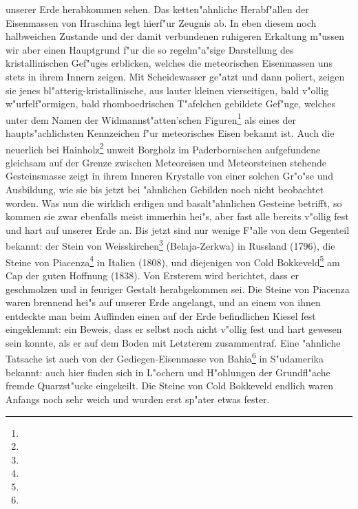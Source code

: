 \documentclass[a4paper, 8pt, oneside, polutonikogreek, german]{article}
\begin{document}
unserer Erde herabkommen sehen. Das ketten"ahnliche Herabf"allen der Eisenmassen von Hraschina legt hierf"ur Zeugnis ab. In eben diesem noch halbweichen Zustande und der damit verbundenen ruhigeren Erkaltung m"ussen wir aber einen Hauptgrund f"ur die so regelm"a"sige Darstellung des kristallinischen Gef"uges erblicken, welches die meteorischen Eisenmassen uns stets in ihrem Innern zeigen. Mit Scheidewasser ge"atzt und dann poliert, zeigen sie jenes bl"atterig-kristallinische, aus lauter kleinen vierseitigen, bald v"ollig w"urfelf"ormigen, bald rhomboedrischen T"afelchen gebildete Gef"uge, welches unter dem Namen der Widmannst"atten'schen Figuren\footnote{} als eines der haupts"achlichsten Kennzeichen f"ur meteorisches Eisen bekannt ist. Auch die neuerlich bei Hainholz\footnote{} unweit Borgholz im Paderbornischen aufgefundene gleichsam auf der Grenze zwischen Meteoreisen und Meteorsteinen stehende Gesteinsmasse zeigt in ihrem Inneren Krystalle von einer solchen Gr"o"se und Ausbildung, wie sie bis jetzt bei "ahnlichen Gebilden noch nicht beobachtet worden. Was nun die wirklich erdigen und basalt"ahnlichen Gesteine betrifft, so kommen sie zwar ebenfalls meist immerhin hei"s, aber fast alle bereits v"ollig fest und hart auf unserer Erde an. Bis jetzt sind nur wenige F"alle von dem Gegenteil bekannt: der Stein von Weisskirchen\footnote{} (Belaja-Zerkwa) in Russland (1796), die Steine von Piacenza\footnote{} in Italien (1808), und diejenigen von Cold Bokkeveld\footnote{} am Cap der guten Hoffnung (1838). Von Ersterem wird berichtet, dass er geschmolzen und in feuriger Gestalt herabgekommen sei. Die Steine von Piacenza waren brennend hei"s auf unserer Erde angelangt, und an einem von ihnen entdeckte man beim Auffinden einen auf der Erde befindlichen Kiesel fest eingeklemmt: ein Beweis, dass er selbst noch nicht v"ollig fest und hart gewesen sein konnte, als er auf dem Boden mit Letzterem zusammentraf. Eine "ahnliche Tatsache ist auch von der Gediegen-Eisenmasse von Bahia\footnote{} in S"udamerika bekannt: auch hier finden sich in L"ochern und H"ohlungen der Grundfl"ache fremde Quarzst"ucke eingekeilt. Die Steine von Cold Bokkeveld endlich waren Anfangs noch sehr weich und wurden erst sp"ater etwas fester.
\end{document}
